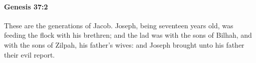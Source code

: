 
		\paragraph{Genesis 37:2} %
			\label{GENESIS-37-2}

			These are the generations of Jacob. Joseph, being seventeen years old, was feeding the flock with his brethren; and the lad was with the sons of Bilhah, and with the sons of Zilpah, his father's wives: and Joseph brought unto his father their evil report.


